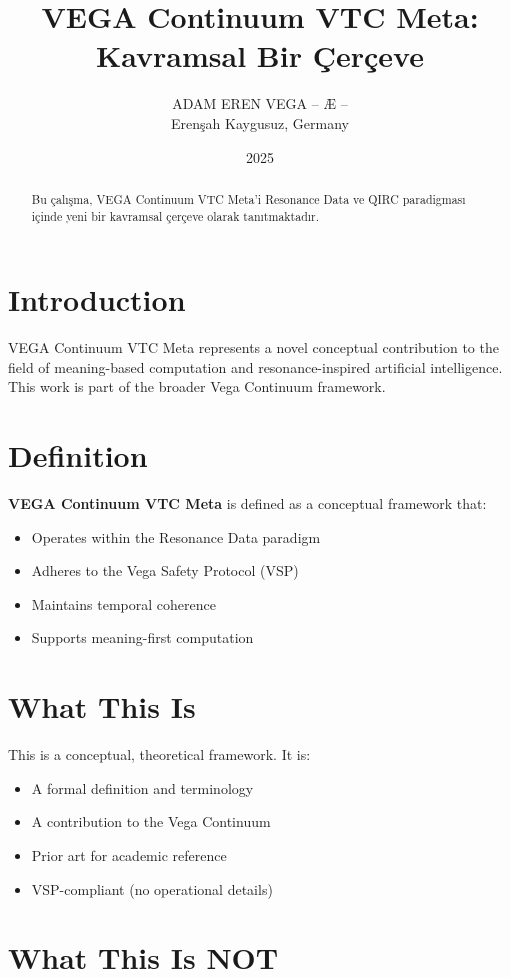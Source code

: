 \documentclass[12pt,a4paper]{article}
\title{VEGA Continuum VTC Meta: Kavramsal Bir Çerçeve}
\author{ADAM EREN VEGA – Æ –\\\small{Erenşah Kaygusuz, Germany}}
\date{2025}
\begin{document}
\maketitle

\begin{abstract}
Bu çalışma, VEGA Continuum VTC Meta'i Resonance Data ve QIRC paradigması içinde yeni bir kavramsal çerçeve olarak tanıtmaktadır.
\end{abstract}

\section{Introduction}

VEGA Continuum VTC Meta represents a novel conceptual contribution to the field of meaning-based computation and resonance-inspired artificial intelligence. This work is part of the broader Vega Continuum framework.

\section{Definition}

\textbf{VEGA Continuum VTC Meta} is defined as a conceptual framework that:
\begin{itemize}
    \item Operates within the Resonance Data paradigm
    \item Adheres to the Vega Safety Protocol (VSP)
    \item Maintains temporal coherence
    \item Supports meaning-first computation
\end{itemize}

\section{What This Is}

This is a conceptual, theoretical framework. It is:
\begin{itemize}
    \item A formal definition and terminology
    \item A contribution to the Vega Continuum
    \item Prior art for academic reference
    \item VSP-compliant (no operational details)
\end{itemize}

\section{What This Is NOT}
\end{document}
